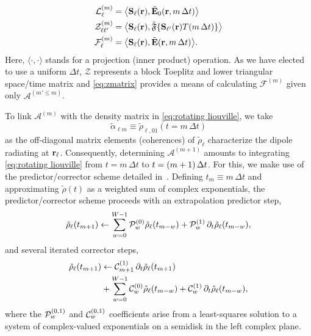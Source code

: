 \begin{subequations}
  \begin{align}
    \mathcal{L}^{(m)}_{\ell} &= \big\langle \mathbf{S}_\ell(\vb{r}), \tilde{\vb{E}}_0(\vb{r}, m \, \Delta t) \big\rangle \\
    \mathcal{Z}^{(m)}_{\ell \ell'} &= \big\langle \mathbf{S}_\ell(\vb{r}), \tilde{\mathfrak{F}}\{ \mathbf{S}_{\ell'}(\mathbf{r}) T(m \, \Delta t) \} \big\rangle \\
    \mathcal{F}^{(m)}_\ell &= \big\langle \mathbf{S}_\ell(\vb{r}), \tilde{\mathbf{E}}(\vb{r}, m \, \Delta t) \big\rangle.
  \end{align}
  \label{eq:projections}
\end{subequations}
Here, $\langle \cdot, \cdot \rangle$ stands for a projection (inner product) operation.
As we have elected to use a uniform $\Delta t$, $\mathcal{Z}$ represents a block Toeplitz and lower triangular space/time matrix and \cref{eq:zmatrix} provides a means of calculating $\mathcal{F}^{(m)}$ given only $\mathcal{A}^{(m' \le m)}$.

To link $\mathcal{A}^{(m)}$ with the density matrix in \cref{eq:rotating liouville}, we take
\begin{equation}
  \tilde{\alpha}_{\ell m} \equiv \tilde{\rho}_{\ell, 01}(t = m \, \Delta t)
  \label{eq:polarization definition}
\end{equation}
as the off-diagonal matrix elements (coherences) of $\tilde{\rho}_{\ell}$ characterize the dipole radiating at $\vb{r}_\ell$.
Consequently, determining $\mathcal{A}^{(m + 1)}$ amounts to integrating \cref{eq:rotating liouville} from $t = m \, \Delta t$ to $t = \qty(m + 1) \, \Delta t$.
For this, we make use of the predictor/corrector scheme detailed in~\cite{Glaser2009}.
Defining $t_m \equiv m \, \Delta t$ and approximating $\tilde{\rho}(t)$ as a weighted sum of complex exponentials, the predictor/corrector scheme proceeds with an extrapolation predictor step,
\begin{equation}
  \tilde{\rho}_\ell(t_{m + 1}) \leftarrow \sum_{w = 0}^{W-1} \mathcal{P}_w^{\qty(0)} \tilde{\rho}_\ell(t_{m-w}) + \mathcal{P}_w^{\qty(1)} \, \partial_t \tilde{\rho}_\ell(t_{m-w}),
  \label{eq:predictor}
\end{equation}
and several iterated corrector steps,
\begin{equation}
  \begin{aligned}
    \tilde{\rho}_\ell(t_{m + 1}) &\leftarrow \mathcal{C}_{m+1}^{\qty(1)} \, \partial_t \tilde{\rho}_\ell(t_{m+1}) \\
                                 &+ \sum_{w = 0}^{W - 1} \mathcal{C}_w^{\qty(0)} \tilde{\rho}_\ell(t_{m-w}) + \mathcal{C}_w^{\qty(1)} \, \partial_t \tilde{\rho}_\ell(t_{m-w}),
  \end{aligned}
  \label{eq:corrector}
\end{equation}
where the $\mathcal{P}_w^{\qty(0, 1)}$ and $\mathcal{C}_w^{\qty(0, 1)}$ coefficients arise from a least-squares solution to a system of complex-valued exponentials on a semidisk in the left complex plane.

